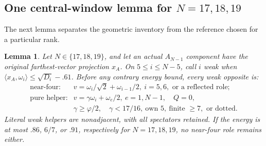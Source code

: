 \documentclass[11pt]{article}
\newtheorem{lemma}[theorem]{Lemma}
\theoremstyle{definition}
\theoremstyle{remark}
\newcommand{\ip}[2]{\langle #1,#2\rangle}
\begin{document}
\subsection{One central-window lemma for \(N=17,18,19\)}
\label{app:Acentralwindow}
The next lemma separates the geometric inventory from the
reference chosen for a particular rank.
\begin{lemma}
Let \(N\in\{17,18,19\}\), and let an actual \(A_{N-1}\)
component have the original farthest-vector projection \(x_A\).
On \(5\leq i\leq N-5\), call \(i\) weak when
\(\ip{x_A}{\omega_i}\leq\sqrt{D_i}-.61\).
Before any contrary energy bound, every weak opposite is:
\[
\begin{array}{ll}
\text{near-four:}&v=\omega_i/\sqrt2+\omega_{i-1}/2,\
 i=5,6,\text{ or a reflected role};\\
\text{pure helper:}&v=\gamma\omega_i+\omega_e/2,\
 e=1,N-1,\quad Q=0,\\
 &\gamma\geq\varphi/2,\quad\gamma<17/16,\
 \text{own }5,\ \text{finite }\geq7,\text{ or dotted}.
\end{array}
\]
Literal weak helpers are nonadjacent, with all spectators
retained. If the energy is at most \(.86\), \(6/7\), or
\(.91\), respectively for \(N=17,18,19\), no near-four
role remains either.
\end{lemma}
\end{document}
